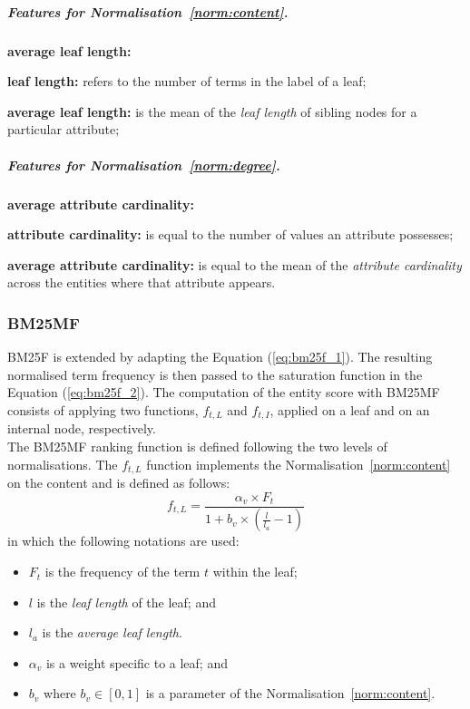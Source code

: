 \subparagraph{Features for Normalisation~\ref{norm:content}.}

\begin{labeling}{\textbf{average leaf length:}}
  \item[\textbf{leaf length:}] refers to the number of terms in the label of a leaf;
  \item[\textbf{average leaf length:}] is the mean of the \emph{leaf length} of sibling nodes for a particular attribute;
\end{labeling}

\subparagraph{Features for Normalisation~\ref{norm:degree}.}

\begin{labeling}{\textbf{average attribute cardinality:}}
  \item[\textbf{attribute cardinality:}] is equal to the number of values an attribute possesses;
  \item[\textbf{average attribute cardinality:}] is equal to the mean of the \emph{attribute cardinality} across the entities where that attribute appears.
\end{labeling}

\subsubsection{BM25MF}
\label{sec:bm25mf-function}

BM25F is extended by adapting the Equation (\ref{eq:bm25f_1}). The resulting normalised term frequency is then passed to the saturation function in the Equation (\ref{eq:bm25f_2}).
The computation of the entity score with \gls{BM25MF} consists of applying two functions, $f_{t,L}$ and $f_{t,I}$, applied on a leaf and on an internal node, respectively.\\

The \gls{BM25MF} ranking function is defined following the two levels of normalisations.
The $f_{t,L}$ function implements the Normalisation~\ref{norm:content} on the content and is defined as follows:
\begin{equation}
\label{bm25mf_v}
f_{t,L} = \frac{\alpha_v\times F_t}{1+b_v\times\left(\frac{l}{l_a}-1\right)}
\end{equation}
in which the following notations are used:
\begin{itemize}
	\item $F_t$ is the frequency of the term $t$ within the leaf;
	\item $l$ is the \emph{leaf length} of the leaf; and
	\item $l_a$ is the \emph{average leaf length}.
	\item $\alpha_v$ is a weight specific to a leaf; and
	\item $b_v$ where $b_v \in \left[0,1\right]$ is a parameter of the Normalisation~\ref{norm:content}.
\end{itemize}


